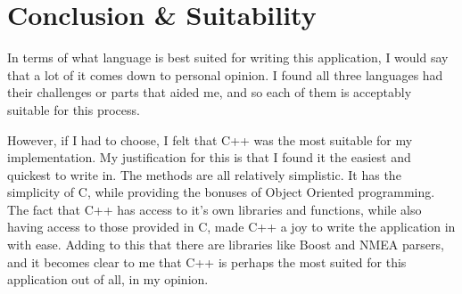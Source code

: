 \documentclass{article}
\begin{document}



\section{Conclusion \& Suitability}
In terms of what language is best suited for writing this application, I would say that a lot of it comes down to personal opinion. I found all three languages had their challenges or parts that aided me, and so each of them is acceptably suitable for this process. 

However, if I had to choose, I felt that C++  was the most suitable for my implementation. My justification for this is that I found it the easiest and quickest to write in. The methods are all relatively simplistic. It has the simplicity of C, while providing the bonuses of Object Oriented programming. The fact that C++ has access to it's own libraries and functions, while also having access to those provided in C, made C++ a joy to write the application in with ease. Adding to this that there are libraries like Boost and NMEA parsers, and it becomes clear to me that C++ is perhaps the most suited for this application out of all, in my opinion.

\clearpage

\end{document}
